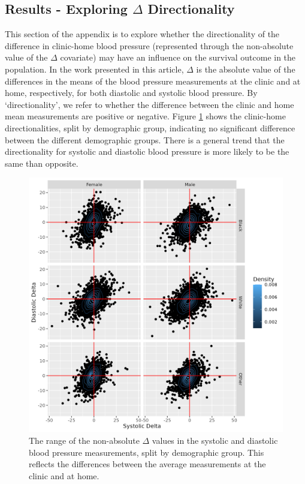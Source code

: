\documentclass[
]{article}
\begin{document}
\subsection{\texorpdfstring{Results - Exploring \(\Delta\) Directionality}{Results - Exploring \textbackslash Delta Directionality}}\label{results---exploring-delta-directionality}

This section of the appendix is to explore whether the directionality of the difference in clinic-home blood pressure (represented through the non-absolute value of the \(\Delta\) covariate) may have an influence on the survival outcome in the population. In the work presented in this article, \(\Delta\) is the absolute value of the differences in the means of the blood pressure measurements at the clinic and at home, respectively, for both diastolic and systolic blood pressure. By `directionality', we refer to whether the difference between the clinic and home mean measurements are positive or negative. Figure \ref{fig:DeltaDensities} shows the clinic-home directionalities, split by demographic group, indicating no significant difference between the different demographic groups. There is a general trend that the directionality for systolic and diastolic blood pressure is more likely to be the same than opposite.

\begin{figure}
\centering
\includegraphics{./Rmarkdown_Plots/Delta_plusminus_Demography.png}
\caption{The range of the non-absolute \(\Delta\) values in the systolic and diastolic blood pressure measurements, split by demographic group. This reflects the differences between the average measurements at the clinic and at home.}\label{fig:DeltaDensities}
\end{figure}
\end{document}

